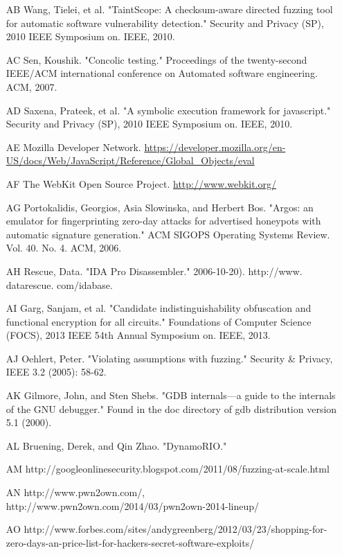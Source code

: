 \documentclass[11pt,expanded,copyright]{fsuthesis}
\begin{document}
\begin{itemize}
	\item [AB] Wang, Tielei, et al. "TaintScope: A checksum-aware directed fuzzing tool for automatic software vulnerability detection." Security and Privacy (SP), 2010 IEEE Symposium on. IEEE, 2010.
	\item [AC] Sen, Koushik. "Concolic testing." Proceedings of the twenty-second IEEE/ACM international conference on Automated software engineering. ACM, 2007.
	\item [AD] Saxena, Prateek, et al. "A symbolic execution framework for javascript." Security and Privacy (SP), 2010 IEEE Symposium on. IEEE, 2010.
	\item [AE] Mozilla Developer Network. \url{https://developer.mozilla.org/en-US/docs/Web/JavaScript/Reference/Global\_Objects/eval}
	\item [AF] The WebKit Open Source Project. \url{http://www.webkit.org/}
	\item [AG] Portokalidis, Georgios, Asia Slowinska, and Herbert Bos. "Argos: an emulator for fingerprinting zero-day attacks for advertised honeypots with automatic signature generation." ACM SIGOPS Operating Systems Review. Vol. 40. No. 4. ACM, 2006.
	\item [AH] Rescue, Data. "IDA Pro Disassembler." 2006-10-20). http://www. datarescue. com/idabase.
	\item [AI] Garg, Sanjam, et al. "Candidate indistinguishability obfuscation and functional encryption for all circuits." Foundations of Computer Science (FOCS), 2013 IEEE 54th Annual Symposium on. IEEE, 2013.
	\item [AJ] Oehlert, Peter. "Violating assumptions with fuzzing." Security \& Privacy, IEEE 3.2 (2005): 58-62.
	\item [AK] Gilmore, John, and Sten Shebs. "GDB internals—a guide to the internals of the GNU debugger." Found in the doc directory of gdb distribution version 5.1 (2000).
	\item [AL] Bruening, Derek, and Qin Zhao. "DynamoRIO."	
	\item [AM] http://googleonlinesecurity.blogspot.com/2011/08/fuzzing-at-scale.html
	\item [AN] http://www.pwn2own.com/, http://www.pwn2own.com/2014/03/pwn2own-2014-lineup/
	\item [AO] http://www.forbes.com/sites/andygreenberg/2012/03/23/shopping-for-zero-days-an-price-list-for-hackers-secret-software-exploits/
	

\end{itemize}
\end{document}
